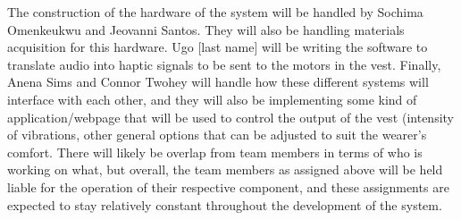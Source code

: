 The construction of the hardware of the system will be handled by Sochima Omenkeukwu and Jeovanni Santos. They will also be handling materials acquisition for this hardware. Ugo [last name] will be writing the software to translate audio into haptic signals to be sent to the motors in the vest. Finally, Anena Sims and Connor Twohey will handle how these different systems will interface with each other, and they will also be implementing some kind of application/webpage that will be used to control the output of the vest (intensity of vibrations, other general options that can be adjusted to suit the wearer’s comfort. There will likely be overlap from team members in terms of who is working on what, but overall, the team members as assigned above will be held liable for the operation of their respective component, and these assignments are expected to stay relatively constant throughout the development of the system.